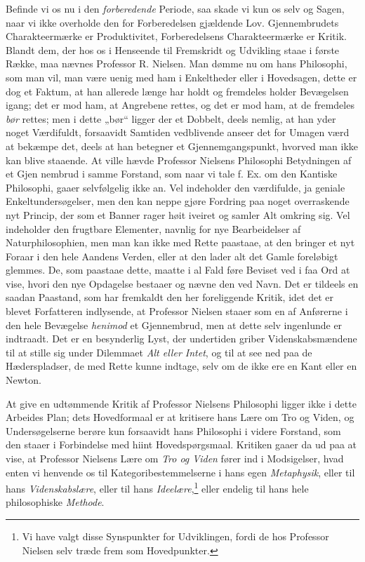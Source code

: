 \documentclass[12pt,a4paper]{book}
\newcommand{\opage}[1]{\marginnote{\footnotesize\textit{[#1]}}}
\begin{document}
Befinde vi os nu i den \emph{forberedende} Periode, saa
skade vi kun os selv og Sagen, naar vi ikke overholde
den for Forberedelsen gjældende Lov. Gjennembrudets
Charakteermærke er Produktivitet, Forberedelsens Charakteermærke
er Kritik. Blandt dem, der hos os i Henseende
til Fremskridt og Udvikling staae i første Række,
maa nævnes Professor R. Nielsen. Man dømme nu
om hans Philosophi, som man vil, man være uenig
med ham i Enkeltheder eller i Hovedsagen, dette er dog
et Faktum, at han allerede længe har holdt og fremdeles
holder Bevægelsen igang; det er mod ham, at Angrebene
rettes, og det er mod ham, at de fremdeles \emph{bør}
rettes; men i dette „bør“ ligger der et Dobbelt, deels
nemlig, at han yder noget Værdifuldt, forsaavidt Samtiden
vedblivende anseer det for Umagen værd at bekæmpe
det, deels at han betegner et Gjennemgangspunkt,
hvorved man ikke kan blive staaende. At ville hævde
Professor Nielsens Philosophi Betydningen af et Gjen%
\opage{5}\setcounter{footnote}{0}%
nembrud i samme Forstand, som naar vi tale f. Ex.
om den Kantiske Philosophi, gaaer selvfølgelig ikke an.
Vel indeholder den værdifulde, ja geniale Enkeltundersøgelser,
men den kan neppe gjøre Fordring paa noget
overraskende nyt Princip, der som et Banner rager
høit iveiret og samler Alt omkring sig. Vel indeholder
den frugtbare Elementer, navnlig for nye Bearbeidelser
af Naturphilosophien, men man kan ikke med
Rette paastaae, at den bringer et nyt Foraar i den hele
Aandens Verden, eller at den lader alt det Gamle
foreløbigt glemmes. De, som paastaae dette, maatte i
al Fald føre Beviset ved i faa Ord at vise, hvori
den nye Opdagelse bestaaer og nævne den ved Navn.
Det er tildeels en saadan Paastand, som har fremkaldt
den her foreliggende Kritik, idet det er blevet Forfatteren
indlysende, at Professor Nielsen staaer som
en af Anførerne i den hele Bevægelse \emph{henimod} et
Gjennembrud, men at dette selv ingenlunde er indtraadt.
Det er en besynderlig Lyst, der undertiden
griber Videnskabsmændene til at stille sig under Dilemmaet
\emph{Alt eller Intet}, og til at see ned paa de Hæderspladser,
de med Rette kunne indtage, selv om de
ikke ere en Kant eller en Newton.

At give en udtømmende Kritik af Professor Nielsens
Philosophi ligger ikke i dette Arbeides Plan; dets Hovedformaal
er at kritisere hans Lære om Tro og Viden,
og Undersøgelserne berøre kun forsaavidt hans Philosophi
i videre Forstand, som den staaer i Forbindelse med
hiint Hovedspørgsmaal. Kritiken gaaer da ud paa at
vise, at Professor Nielsens Lære om \emph{Tro og Viden}
\opage{6}\setcounter{footnote}{0}%
fører ind i Modsigelser, hvad enten vi henvende os
til Kategoribestemmelserne i hans egen \emph{Metaphysik},
eller til hans \emph{Videnskabslære}, eller til hans \emph{Ideelære},\footnote{Vi have valgt disse Synspunkter for Udviklingen, fordi de
hos Professor Nielsen selv træde frem som Hovedpunkter.}
eller endelig til hans hele philosophiske \emph{Methode}.
\end{document}
